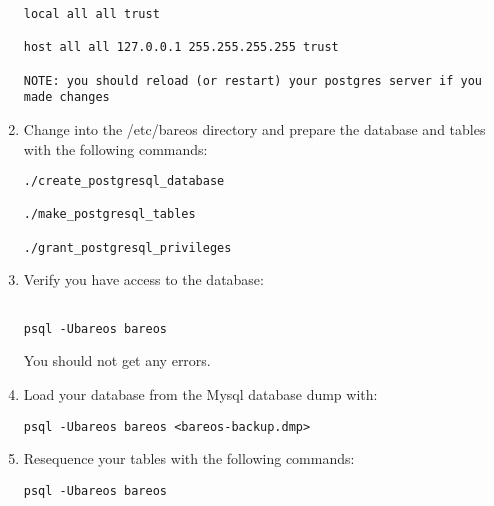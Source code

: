 \begin{enumerate}
\footnotesize
\begin{verbatim}
local all all trust

host all all 127.0.0.1 255.255.255.255 trust

NOTE: you should reload (or restart) your postgres server if you  made changes

\end{verbatim}
\normalsize

\item Change into the /etc/bareos directory and prepare the database  and
   tables with the following commands:

\footnotesize
\begin{verbatim}
./create_postgresql_database

./make_postgresql_tables

./grant_postgresql_privileges

\end{verbatim}
\normalsize

\item Verify you have access to the database:

   \footnotesize
\begin{verbatim}

psql -Ubareos bareos

\end{verbatim}
\normalsize

You should not get any errors.
\item Load your database from the Mysql database dump with:

   \footnotesize
\begin{verbatim}
psql -Ubareos bareos <bareos-backup.dmp>

\end{verbatim}
\normalsize

\item Resequence your tables with the following commands:

   \footnotesize
\begin{verbatim}
psql -Ubareos bareos


\end{verbatim}
\end{enumerate}

